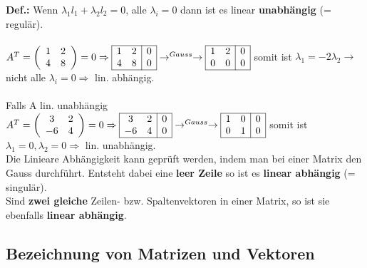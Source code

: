 	\textbf{Def.:} Wenn $\lambda_1 l_1 + \lambda_2 l_2 = 0$, alle $\lambda_i = 0$ dann ist es linear \textbf{unabhängig} (= regulär). \\ \\

	$A^T = \left(\begin{array}{cc}
		1 & 2 \\
		4 & 8
	\end{array}\right) =  0 \Rightarrow \begin{array}{|cc|c|}
		\hline1 & 2 & 0\\
		4 & 8 & 0\\
		\hline
	\end{array} \rightarrow^{Gauss} \rightarrow \begin{array}{|cc|c|}
		\hline 1 & 2 & 0\\
		0 & 0 & 0\\
		\hline
	\end{array} $ \qquad somit ist $\lambda_1 = -2\lambda_2 \rightarrow$ nicht alle $\lambda_i = 0 \Rightarrow$ lin. abhängig.\\ \\

	Falls A lin. unabhängig\\
	$ A^T = \left(\begin{array}{cc}
		3 & 2\\
		-6 & 4\\
	\end{array}\right) = 0 \Rightarrow \begin{array}{|cc|c|}
		\hline 3 & 2 & 0\\
		-6 & 4 & 0 \\
		\hline
	\end{array} \rightarrow^{Gauss} \rightarrow \begin{array}{|cc|c|}
		\hline 1 & 0 & 0\\
		0 & 1 & 0\\
		\hline
	\end{array}$  \qquad somit ist $\lambda_1 = 0, \lambda_2 = 0 \Rightarrow$ lin. unabhängig.\\

	Die Linieare Abhängigkeit kann geprüft werden, indem man bei einer Matrix den Gauss durchführt. Entsteht dabei eine \textbf{leer Zeile}	so ist es \textbf{linear abhängig} (= singulär). \\
	Sind \textbf{zwei gleiche} Zeilen- bzw. Spaltenvektoren in einer Matrix, so ist sie ebenfalls \textbf{linear abhängig}.


\subsection{Bezeichnung von Matrizen und Vektoren}
